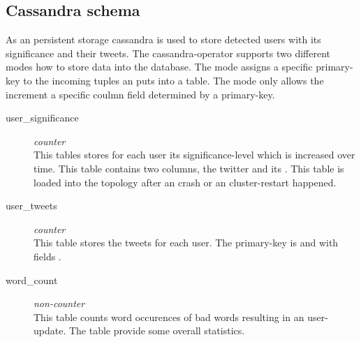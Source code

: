 \subsection{Cassandra schema}
As an persistent storage cassandra is used to store detected users with its significance and their tweets. The cassandra-operator supports two different modes how to store data into the database. The  mode assigns a specific primary-key to the incoming tuples an puts into a table. The  mode only allows the increment a specific coulmn field determined by a primary-key.  

\begin{description}
  \item[user\_significance] \textit{counter} \hfill \\
  This tables stores for each user its significance-level which is increased over time. This table contains two columns, the twitter  and its . This table is loaded into the topology after an crash or an cluster-restart happened.
  
  \item[user\_tweets] \textit{counter}  \hfill \\
  This table stores the tweets for each user. The primary-key is  and  with fields .
  
  \item[word\_count]  \textit{non-counter} \hfill \\
  This table counts word occurences of bad words resulting in an user-update. The table provide some overall statistics.
  
\end{description}
    